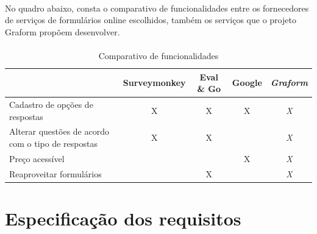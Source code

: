 \documentclass[11pt]{article}
\begin{document}
      \paragraph{}
      
      No quadro abaixo, consta o comparativo de funcionalidades entre os 
      fornecedores de serviços de formulários online escolhidos, também
      os serviços que o projeto Graform propõem desenvolver.

      \paragraph{}

      \begin{table}[h]
        \begin{center}
          \begin{tabular}{ | p{5cm} | c | c | c | c | }
            \hline
                                                                                & Surveymonkey\cellcolor{gray}  & Eval \& Go\cellcolor{gray} & Google\cellcolor{gray} & \em Graform\cellcolor{gray} \\
            \hline
            Cadastro de opções de respostas\cellcolor{gray}                     & X             & X           & X       & \em X \\
            \hline
            Alterar questões de acordo com o tipo de respostas\cellcolor{gray} & X\footnote[1]             & X\footnote[1]           &         & \em X \\
            \hline
            Preço acessível\cellcolor{gray}                                     &               &             & X       & \em X \\
            \hline
            Reaproveitar formulários\cellcolor{gray}                          &               & X           &         & \em X \\
            \hline
          \end{tabular}
          \caption{Comparativo de funcionalidades}
        \end{center}
      \end{table}
      
  
  \newpage

  \section{Especificação dos requisitos}
\end{document}
